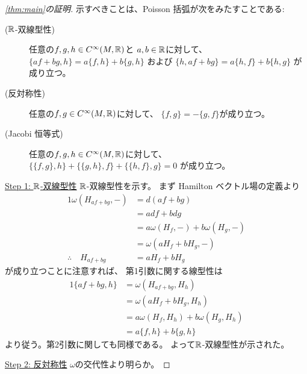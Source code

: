 \documentclass[report, notitlepage]{jlreq}
\begin{document}
\begin{proof}[\cref{thm:main}の証明]
    示すべきことは、Poisson 括弧が次をみたすことである:
    \begin{description}
        \item[($\mathbb{R}$-双線型性)]
            任意の$f, g, h \in C^\infty(M, \mathbb{R})$と
            $a, b \in \mathbb{R}$に対して、
            $\{ af + bg, h \} = a \{ f, h \} + b \{ g, h \}$
            および
            $\{ h, af + bg \} = a \{ h, f \} + b \{ h, g \}$
            が成り立つ。
        \item[(反対称性)]
            任意の$f, g \in C^\infty(M, \mathbb{R})$に対して、
            $\{ f, g \} = - \{ g, f \}$が成り立つ。
        \item[(Jacobi 恒等式)]
            任意の$f, g, h \in C^\infty(M, \mathbb{R})$に対して、
            $\{ \{ f, g \}, h \} + \{ \{ g, h \}, f \} + \{ \{ h, f \}, g \} = 0$
            が成り立つ。
    \end{description}

    \uline{Step 1: $\mathbb{R}$-双線型性} \quad
    $\mathbb{R}$-双線型性を示す。
    まず Hamilton ベクトル場の定義より
    \begin{alignat}{1}
        \omega(H_{af + bg}, {-})
            &=
                d(af + bg)
                \\
            &=
                a df + b dg
                \\
            &=
                a \omega(H_f, {-}) + b \omega(H_g, {-})
                \\
            &=
                \omega(aH_f + bH_g, {-})
                \\
        \therefore \quad
        H_{af + bg}
            &=
                aH_f + bH_g
    \end{alignat}
    が成り立つことに注意すれば、
    第1引数に関する線型性は
    \begin{alignat}{1}
        \{ af + bg, h \}
            &=
                \omega(H_{af + bg}, H_h)
                \\
            &=
                \omega(aH_f + bH_g, H_h)
                \\
            &=
                a\omega(H_f, H_h) + b\omega(H_g, H_h)
                \\
            &=
                a\{ f, h \} + b\{ g, h \}
    \end{alignat}
    より従う。第2引数に関しても同様である。
    よって$\mathbb{R}$-双線型性が示された。

    \uline{Step 2: 反対称性} \quad
    $\omega$の交代性より明らか。


\end{proof}
\end{document}
